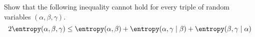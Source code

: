 Show that the following inequality cannot hold for every triple of random variables
$(\alpha, \beta, \gamma)$.
$$
    2 \entropy(\alpha, \beta, \gamma) \le \entropy(\alpha, \beta) + \entropy(\alpha, \gamma \mid \beta)
    + \entropy(\beta, \gamma \mid \alpha)
$$
